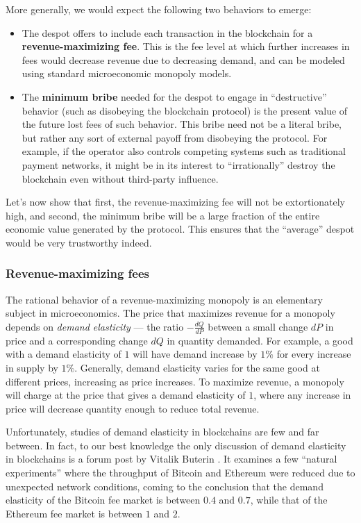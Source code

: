 \documentclass[letterpaper,12pt,oneside]{article}
\begin{document}
More generally, we would expect the following two behaviors to emerge:

\begin{itemize}
    \item The despot offers to include each transaction in the blockchain for a \textbf{revenue-maximizing fee}. This is the fee level at which further increases in fees would decrease revenue due to decreasing demand, and can be modeled using standard microeconomic monopoly models.
    \item The \textbf{minimum bribe} needed for the despot to engage in ``destructive'' behavior (such as disobeying the blockchain protocol) is the present value of the future lost fees of such behavior. This bribe need not be a literal bribe, but rather any sort of external payoff from disobeying the protocol. For example, if the operator also controls competing systems such as traditional payment networks, it might be in its interest to ``irrationally'' destroy the blockchain even without third-party influence.
\end{itemize}

Let's now show that first, the revenue-maximizing fee will not be extortionately high, and second, the minimum bribe will be a large fraction of the entire economic value generated by the protocol. This ensures that the ``average'' despot would be very trustworthy indeed.

\subsubsection{Revenue-maximizing fees}

The rational behavior of a revenue-maximizing monopoly is an elementary subject in microeconomics. The price that maximizes revenue for a monopoly depends on \emph{demand elasticity} --- the ratio $- \frac{dQ}{dP}$ between a small change $dP$ in price and a corresponding change $dQ$ in quantity demanded. For example, a good with a demand elasticity of $1$ will have demand increase by $1\%$ for every increase in supply by $1\%$. Generally, demand elasticity varies for the same good at different prices, increasing as price increases. To maximize revenue, a monopoly will charge at the price that gives a demand elasticity of $1$, where any increase in price will decrease quantity enough to reduce total revenue.

Unfortunately, studies of demand elasticity in blockchains are few and far between. In fact, to our best knowledge the only discussion of demand elasticity in blockchains is a forum post by Vitalik Buterin \cite{elasticity}. It examines a few ``natural experiments'' where the throughput of Bitcoin and Ethereum were reduced due to unexpected network conditions, coming to the conclusion that the demand elasticity of the Bitcoin fee market is between $0.4$ and $0.7$, while that of the Ethereum fee market is between $1$ and $2$.
\end{document}

